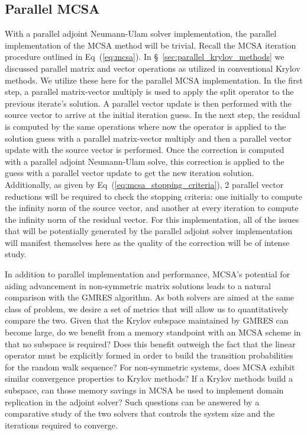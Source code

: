 \subsection{Parallel MCSA}
\label{subsec:parallel_mcsa}
With a parallel adjoint Neumann-Ulam solver implementation, the
parallel implementation of the MCSA method will be trivial. Recall the
MCSA iteration procedure outlined in Eq~(\ref{eq:mcsa}). In
\S~\ref{sec:parallel_krylov_methods} we discussed parallel matrix and
vector operations as utilized in conventional Krylov methods. We
utilize these here for the parallel MCSA implementation. In the first
step, a parallel matrix-vector multiply is used to apply the split
operator to the previous iterate's solution. A parallel vector update
is then performed with the source vector to arrive at the initial
iteration guess. In the next step, the residual is computed by the
same operations where now the operator is applied to the solution
guess with a parallel matrix-vector multiply and then a parallel
vector update with the source vector is performed. Once the correction
is computed with a parallel adjoint Neumann-Ulam solve, this
correction is applied to the guess with a parallel vector update to
get the new iteration solution. Additionally, as given by
Eq~(\ref{eq:mcsa_stopping_criteria}), 2 parallel vector reductions
will be required to check the stopping criteria: one initially to
compute the infinity norm of the source vector, and another at every
iteration to compute the infinity norm of the residual vector. For
this implementation, all of the issues that will be potentially
generated by the parallel adjoint solver implementation will manifest
themselves here as the quality of the correction will be of intense
study.

In addition to parallel implementation and performance, MCSA's
potential for aiding advancement in non-symmetric matrix solutions
leads to a natural comparison with the GMRES algorithm. As both
solvers are aimed at the same class of problem, we desire a set of
metrics that will allow us to quantitatively compare the two. Given
that the Krylov subspace maintained by GMRES can become large, do we
benefit from a memory standpoint with an MCSA scheme in that no
subspace is required? Does this benefit outweigh the fact that the
linear operator must be explicitly formed in order to build the
transition probabilities for the random walk sequence? For
non-symmetric systems, does MCSA exhibit similar convergence
properties to Krylov methods? If a Krylov methods build a subspace,
can those memory savings in MCSA be used to implement domain
replication in the adjoint solver? Such questions can be answered by a
comparative study of the two solvers that controls the system size and
the iterations required to converge.
